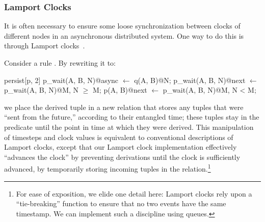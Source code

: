 

\subsubsection{Lamport Clocks}
\label{sec:lamport}
It is often necessary to ensure some loose synchronization between clocks of
different nodes in an asynchronous distributed system.  One way to do this is
through Lamport clocks~\cite{timeclocks}.

Consider a rule .  By rewriting it
to:

\begin{Dedalus}
persist[p, 2]
p\_wait(A, B, N)@async \(\leftarrow\) q(A, B)@N;
p\_wait(A, B, N)@next \(\leftarrow\) p\_wait(A, B, N)@M, N \(\ge\) M;
p(A, B)@next \(\leftarrow\) p\_wait(A, B, N)@M, N < M;
\end{Dedalus}

\noindent we place the derived tuple in a new relation  that
stores any tuples that were ``sent from the future,'' according to their
entangled time; these tuples stay in the  predicate until the
point in time at which they were derived.  
This manipulation of timesteps and clock values is equivalent to conventional
descriptions of Lamport clocks, except that our Lamport clock implementation
effectively ``advances the clock'' by preventing derivations until the clock is
sufficiently advanced, by temporarily storing incoming tuples in the
 relation.\footnote{For ease of exposition, we elide one
detail here: Lamport clocks rely upon a ``tie-breaking'' function to ensure
that no two events have the same timestamp.  We can implement such a discipline
using queues.}


